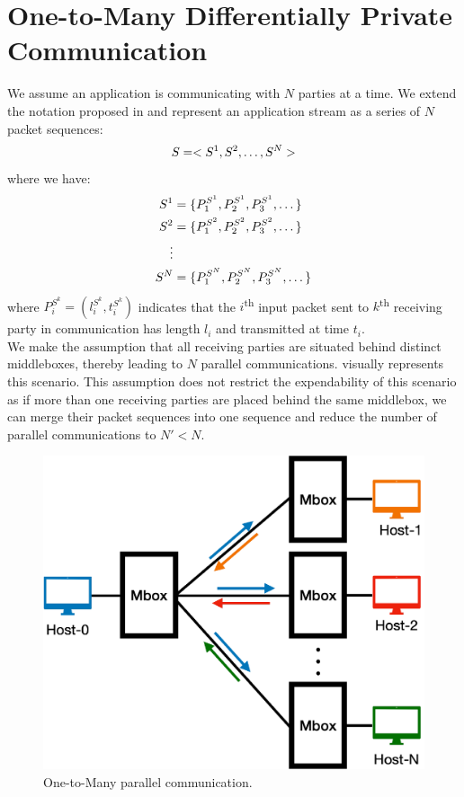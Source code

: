 \section{One-to-Many Differentially Private Communication}
We assume an application is communicating with $N$ parties at a time.
We extend the notation proposed in  and represent an application stream as a series of $N$ packet sequences:
\begin{equation}
  S = <S^1, S^2, \dots, S^N>
\end{equation}
\noindent
where we have:
\begin{align*}
  S^1 &= \{{P^{S^1}_1}, {P^{S^1}_2}, {P^{S^1}_3}, \dots \} \\
  S^2 &= \{{P^{S^2}_1}, {P^{S^2}_2}, {P^{S^2}_3}, \dots \} \\
  \vdots& \\
  S^N &= \{{P^{S^N}_1}, {P^{S^N}_2}, {P^{S^N}_3}, \dots \} 
\end{align*}
\noindent
where $P^{S^k}_i = (l_i^{S^k}, t_i^{S^k})$ indicates that the $i$\textsuperscript{th} input packet sent to $k$\textsuperscript{th} receiving party in communication has length $l_i$ and transmitted at time $t_i$.
\\
\noindent
We make the assumption that all receiving parties are situated behind distinct middleboxes, thereby leading to $N$ parallel communications.  visually represents this scenario.
This assumption does not restrict the expendability of this scenario as if more than one receiving parties are placed behind the same middlebox, we can merge their packet sequences into one sequence and reduce the number of parallel communications to $N' < N$.   
\begin{figure}[t]
  \centering
  \includegraphics[width=0.7\columnwidth]{figures/one-to-many-communication.pdf}
  \caption{
    One-to-Many parallel communication.
  }
  \label{fig:one-to-many-communication}
\end{figure}



